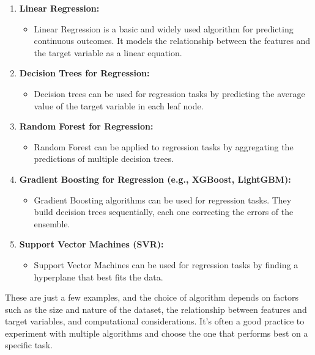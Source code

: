 \documentclass[
]{book}
\providecommand{\tightlist}{%
  \setlength{\itemsep}{0pt}\setlength{\parskip}{0pt}}
\begin{document}
\begin{enumerate}
\def\labelenumi{\arabic{enumi}.}
\tightlist
\item
  \textbf{Linear Regression:}

  \begin{itemize}
  \tightlist
  \item
    Linear Regression is a basic and widely used algorithm for predicting continuous outcomes. It models the relationship between the features and the target variable as a linear equation.
  \end{itemize}
\item
  \textbf{Decision Trees for Regression:}

  \begin{itemize}
  \tightlist
  \item
    Decision trees can be used for regression tasks by predicting the average value of the target variable in each leaf node.
  \end{itemize}
\item
  \textbf{Random Forest for Regression:}

  \begin{itemize}
  \tightlist
  \item
    Random Forest can be applied to regression tasks by aggregating the predictions of multiple decision trees.
  \end{itemize}
\item
  \textbf{Gradient Boosting for Regression (e.g., XGBoost, LightGBM):}

  \begin{itemize}
  \tightlist
  \item
    Gradient Boosting algorithms can be used for regression tasks. They build decision trees sequentially, each one correcting the errors of the ensemble.
  \end{itemize}
\item
  \textbf{Support Vector Machines (SVR):}

  \begin{itemize}
  \tightlist
  \item
    Support Vector Machines can be used for regression tasks by finding a hyperplane that best fits the data.
  \end{itemize}
\end{enumerate}

These are just a few examples, and the choice of algorithm depends on factors such as the size and nature of the dataset, the relationship between features and target variables, and computational considerations. It's often a good practice to experiment with multiple algorithms and choose the one that performs best on a specific task.
\end{document}
